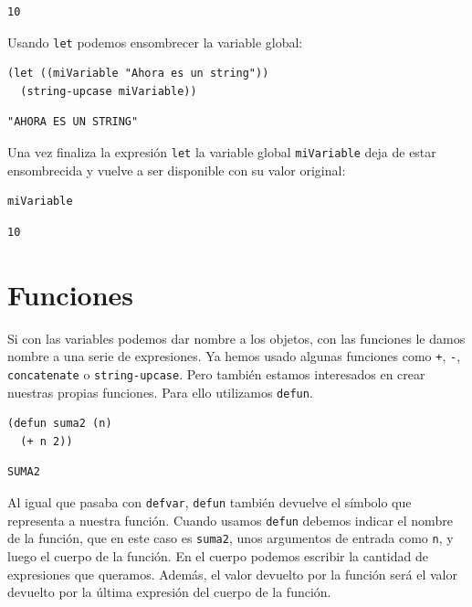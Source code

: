 \documentclass[11pt]{article}
\begin{document}
\begin{verbatim}
10
\end{verbatim}


Usando \texttt{let} podemos ensombrecer la variable global:

\begin{verbatim}
(let ((miVariable "Ahora es un string"))
  (string-upcase miVariable))
\end{verbatim}

\begin{verbatim}
"AHORA ES UN STRING"
\end{verbatim}


Una vez finaliza la expresión \texttt{let} la variable global \texttt{miVariable} deja de estar ensombrecida y vuelve a ser disponible con su valor original:

\begin{verbatim}
miVariable
\end{verbatim}

\begin{verbatim}
10
\end{verbatim}

\section{Funciones}
\label{sec:orgb4647c5}

Si con las variables podemos dar nombre a los objetos, con las funciones le damos nombre a una serie de expresiones. Ya hemos usado algunas funciones como \texttt{+}, \texttt{-}, \texttt{concatenate} o \texttt{string-upcase}. Pero también estamos interesados en crear nuestras propias funciones. Para ello utilizamos \texttt{defun}.

\begin{verbatim}
(defun suma2 (n)
  (+ n 2))
\end{verbatim}

\begin{verbatim}
SUMA2
\end{verbatim}


Al igual que pasaba con \texttt{defvar}, \texttt{defun} también devuelve el símbolo que representa a nuestra función. Cuando usamos \texttt{defun} debemos indicar el nombre de la función, que en este caso es \texttt{suma2}, unos argumentos de entrada como \texttt{n}, y luego el cuerpo de la función. En el cuerpo podemos escribir la cantidad de expresiones que queramos. Además, el valor devuelto por la función será el valor devuelto por la última expresión del cuerpo de la función.
\end{document}
